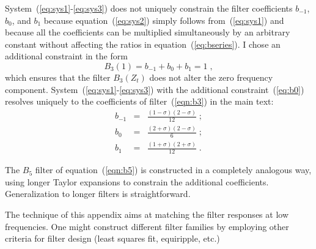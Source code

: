 System~(\ref{eq:sys1}-\ref{eq:sys3}) does not uniquely constrain the
filter coefficients $b_{-1}$, $b_0$, and $b_1$ because
equation~(\ref{eq:sys2}) simply follows from~(\ref{eq:sys1}) and
because all the coefficients can be multiplied simultaneously by an
arbitrary constant without affecting the ratios in
equation~(\ref{eq:bseries}). I chose an additional constraint in the 
form
\begin{equation}
  \label{eq:b0}
  B_3(1) = b_{-1} + b_0 + b_1 = 1\;,
\end{equation}
which ensures that the filter $B_3(Z_t)$ does not alter the zero
frequency component. System~(\ref{eq:sys1}-\ref{eq:sys3}) with the
additional constraint~(\ref{eq:b0}) resolves uniquely to
the coefficients of filter~(\ref{eqn:b3}) in the main text:
\begin{eqnarray}
   b_{-1} & = & \frac{(1-\sigma)(2-\sigma)}{12}\;;   
   \label{eq:sol1}
   \\
  b_0 & = & \frac{(2+\sigma)(2-\sigma)}{6}\;; 
  \label{eq:sol2}
  \\
  b_1 & = & \frac{(1+\sigma)(2+\sigma)}{12}\;.
  \label{eq:sol3}
\end{eqnarray}

The $B_5$ filter of equation~(\ref{eqn:b5}) is constructed in a
completely analogous way, using longer Taylor expansions to constrain
the additional coefficients. Generalization to longer filters is
straightforward.

The technique of this appendix aims at matching the filter responses
at low frequencies. One might construct different filter families by
employing other criteria for filter design (least squares fit, 
equiripple, etc.)

%
%

